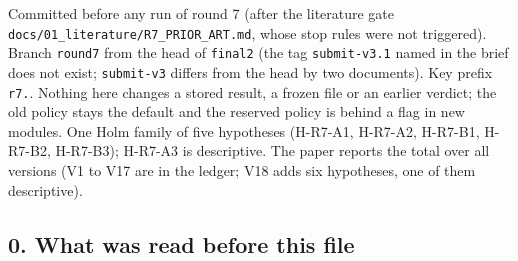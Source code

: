 


Committed before any run of round 7 (after the literature gate \texttt{docs/01\_literature/R7\_PRIOR\_ART.md}, whose stop rules were not triggered). Branch \texttt{round7} from the head of \texttt{final2} (the tag \texttt{submit-v3.1} named in the brief does not exist; \texttt{submit-v3} differs from the head by two documents). Key prefix \texttt{r7.}. Nothing here changes a stored result, a frozen file or an earlier verdict; the old policy stays the default and the reserved policy is behind a flag in new modules. One Holm family of five hypotheses (H-R7-A1, H-R7-A2, H-R7-B1, H-R7-B2, H-R7-B3); H-R7-A3 is descriptive. The paper reports the total over all versions (V1 to V17 are in the ledger; V18 adds six hypotheses, one of them descriptive).

\subsection*{0. What was read before this file}

